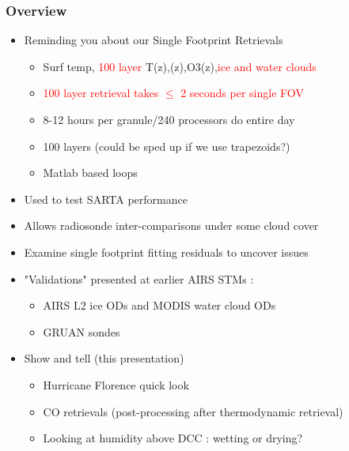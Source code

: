 \documentclass[10pt,t]{beamer}
\begin{document}
\begin{frame}
  \frametitle{Overview}

  \begin{itemize}
  \item Reminding you about our Single Footprint Retrievals
    \begin{itemize}
    \item Surf temp, \textcolor{red}{100 layer}
      T(z),\water(z),O3(z),\textcolor{red}{ice and water clouds}    
    \item \textcolor{red}{100 layer retrieval takes $\le$ 2 seconds per
        single FOV}    
    \item 8-12 hours per granule/240 processors do entire day
    \item 100 layers (could be sped up if we use trapezoids?)
    \item Matlab based loops 
    \end{itemize}
  \item Used to test SARTA performance
  \item Allows radiosonde inter-comparisons under some cloud cover
  \item Examine single footprint fitting residuals to uncover issues
  \item "Validations" presented at earlier AIRS STMs : 
    \begin{itemize}
    \item AIRS L2 ice ODs and MODIS water cloud ODs
    \item GRUAN sondes
    \end{itemize}
  \item Show and tell (this presentation)
    \begin{itemize}
    \item Hurricane Florence quick look
    \item CO retrievals (post-processing after thermodynamic retrieval)
    \item Looking at humidity above DCC : wetting or drying?    
    \end{itemize}
  \end{itemize}
\end{frame}
\end{document}
